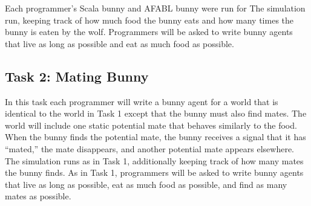 Each programmer's Scala bunny and AFABL bunny were run for The simulation run, keeping track of how much food the bunny eats and how many times the bunny is eaten by the wolf.  Programmers will be asked to write bunny agents that live as long as possible and eat as much food as possible.

\subsection{Task 2: Mating Bunny}\label{sec:task2}

In this task each programmer will write a bunny agent for a world that is identical to the world in Task 1 except that the bunny must also find mates.  The world will include one static  potential mate that behaves similarly to the food.  When the bunny finds the potential mate, the bunny receives a signal that it has ``mated,'' the mate disappears, and another potential mate appears elsewhere.  The simulation runs as in Task 1, additionally keeping track of how many mates the bunny finds.  As in Task 1, programmers will be asked to write bunny agents that live as long as possible, eat as much food as possible, and find as many mates as possible.







